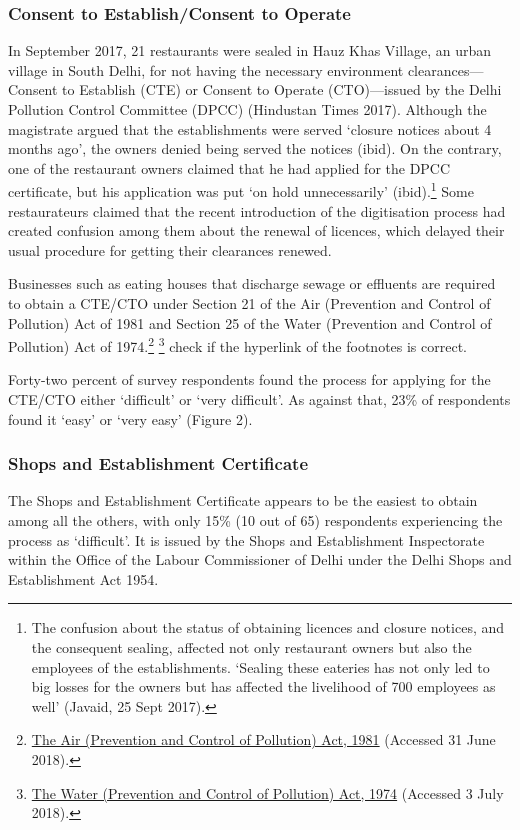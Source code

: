 \documentclass[a4paper, 12pt]{article}
\begin{document}
                  
                   \subsubsection{Consent to Establish/Consent to Operate}
                   In September 2017, 21 restaurants were sealed in Hauz Khas Village, an urban village in South Delhi, for not having the necessary environment clearances—Consent to Establish (CTE) or Consent to Operate (CTO)—issued by the Delhi Pollution 
Control Committee (DPCC) (Hindustan Times 2017). Although the magistrate argued that the establishments were served ‘closure notices about 4 months ago’, the owners denied being served the notices (ibid). On the contrary, one of the restaurant owners 
claimed that he had applied for the DPCC certificate, but his application was put ‘on hold unnecessarily’ (ibid).\footnote{The confusion about the status of obtaining licences and closure notices, and the consequent sealing, affected not only restaurant owners but 
also the employees of the establishments. ‘Sealing these eateries has not only led to big losses for the owners but has affected the livelihood of 700 employees as well’ (Javaid, 25 Sept 2017).} Some restaurateurs claimed that the recent introduction of the 
digitisation process had created confusion among them about the renewal of licences, which delayed their usual procedure for getting their clearances renewed.
                   
                   Businesses such as eating houses that discharge sewage or effluents are required to obtain a CTE/CTO under Section 21 of the Air (Prevention and Control of Pollution) Act of 1981 and Section 25 of the Water (Prevention and Control of Pollution) Act 
of 1974.\footnote{\href{https://bit.ly/2pbaWOw}{The Air (Prevention and Control of Pollution) Act, 1981} (Accessed 31 June 2018).} \footnote{\href{https://bit.ly/2xcUyRW}{The Water (Prevention and Control of Pollution) Act, 1974} (Accessed 3 July 2018).}  %
check if the hyperlink of the footnotes is correct. 
                   
                   Forty-two percent of survey respondents found the process for applying for the CTE/CTO either ‘difficult’ or ‘very difficult’. As against that, 23\% of respondents found it ‘easy’ or ‘very easy’ (Figure 2).
              
                   \subsubsection{Shops and Establishment Certificate}
                   The Shops and Establishment Certificate appears to be the easiest to obtain among all the others, with only 15\% (10 out of 65) respondents experiencing the process as ‘difficult’. It is issued by the Shops and Establishment Inspectorate within the 
Office of the Labour Commissioner of Delhi under the Delhi Shops and Establishment Act 1954.
                   
\end{document}
